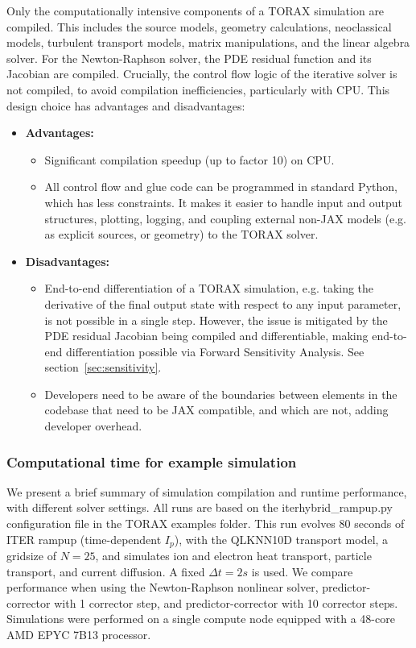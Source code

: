 \documentclass[aps, reprint, nofootinbib]{revtex4-2}
\begin{document}
Only the computationally intensive components of a TORAX simulation are compiled. This includes the source models, geometry calculations, neoclassical models, turbulent transport models, matrix manipulations, and the linear algebra solver. For the Newton-Raphson solver, the PDE residual function and its Jacobian are compiled. Crucially, the control flow logic of the iterative solver is not compiled, to avoid compilation inefficiencies, particularly with CPU. This design choice has advantages and disadvantages:

\begin{itemize}
    \item \textbf{Advantages: } 
    \begin{itemize}[label=$\circ$]
        \item Significant compilation speedup (up to factor 10) on CPU.
        \item All control flow and glue code can be programmed in standard Python, which has less constraints. It makes it easier to handle input and output structures, plotting, logging, and coupling external non-JAX models (e.g. as explicit sources, or geometry) to the TORAX solver.
    \end{itemize}
    \item \textbf{Disadvantages: } 
    \begin{itemize}[label=$\circ$]
        \item End-to-end differentiation of a TORAX simulation, e.g. taking the derivative of the final output state with respect to any input parameter, is not possible in a single step. However, the issue is mitigated by the PDE residual Jacobian being compiled and differentiable, making end-to-end differentiation possible via Forward Sensitivity Analysis. See section~\ref{sec:sensitivity}.
        \item Developers need to be aware of the boundaries between elements in the codebase that need to be JAX compatible, and which are not, adding developer overhead.
    \end{itemize}
\end{itemize}

\subsubsection{Computational time for example simulation}
We present a brief summary of simulation compilation and runtime performance, with different solver settings. All runs are based on the \textsf{iterhybrid\_rampup.py} configuration file in the TORAX examples folder. This run evolves 80 seconds of ITER rampup (time-dependent $I_p$), with the QLKNN10D transport model, a gridsize of $N=25$, and simulates ion and electron heat transport, particle transport, and current diffusion. A fixed $\Delta t=2s$ is used. We compare performance when using the Newton-Raphson nonlinear solver, predictor-corrector with 1 corrector step, and predictor-corrector with 10 corrector steps. Simulations were performed on a single compute node equipped with a 48-core AMD EPYC 7B13 processor.
\end{document}
